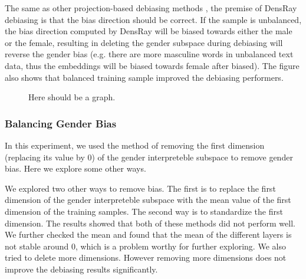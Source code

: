 The same as other projection-based debiasing methods \citep{bolukbasi2016man,zhao2019gender,dev2019attenuating, karve2019conceptor}, the premise of DensRay debiasing is that the bias direction should be correct. If the sample is unbalanced, the bias direction computed by DensRay will be biased towards either the male or the female, resulting in deleting the gender subspace during debiasing will reverse the gender bias (e.g. there are more masculine words in unbalanced text data, thus the embeddings will be biased towards female after biased). The figure also shows that balanced training sample improved the debiasing performers. 
\begin{figure}
    \centering
    \caption{Here should be a graph.}
    \label{fig:my_label}
\end{figure}

\subsubsection{Balancing Gender Bias}
In this experiment, we used the method of removing the first dimension (replacing its value by $0$) of the gender interpreteble subspace to remove gender bias. Here we explore some other ways.

We explored two other ways to remove bias. The first is to replace the first dimension of the gender interpreteble subspace with the mean value of the first dimension of the training samples. The second way is to standardize the first dimension. The results showed that both of these methods did not perform well. We further checked the mean and found that the mean of the different layers is not stable around 0, which is a problem worthy for further exploring. We also tried to delete more dimensions. However removing more dimensions does not improve the debiasing results significantly.


